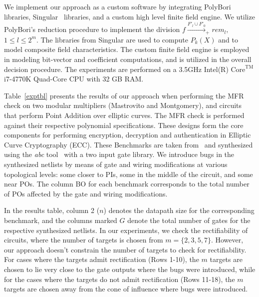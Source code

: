 
We implement our approach as a custom software by integrating PolyBori~\cite{pbori:JSC09} libraries,
{\sc Singular}~\cite{DGPS_410} libraries, and a custom high level finite field engine.
We utilize PolyBori’s reduction procedure to implement the division 
$f\xrightarrow{F'_l\cup F'_{0}}_+ rem_l,$ $ 1 \leq l \leq 2^m$. The libraries from {\sc Singular} 
are used to compute $P_k(X)$ and to model composite field characteristics.
The custom finite field engine is employed in modeling bit-vector and coefficient computations,
and is utilized in the overall decision procedure. The experiments are performed on a 3.5GHz 
Intel(R) $\text{Core}^{\text{TM}}$ i7-4770K Quad-Core CPU with 32 GB RAM.

Table~\ref{exptbl} presents the results of our approach when 
performing the MFR check on two modular multipliers (Mastrovito and Montgomery), and circuits
that perform Point Addition over elliptic curves. The MFR check is performed against 
their respective polynomial specifications. 
These designs form the core components for performing encryption, 
decryption and authentication in Elliptic Curve Cryptography (ECC).
These Benchmarks are taken from~\cite{lv:tcad2013} and synthesized using the {\it abc} 
tool~\cite{abc} with a two input gate library.
We introduce bugs in the synthesized netlists by means of gate and wiring 
modifications at various topological levels: some closer to PIs, 
some in the middle of the circuit, and some near POs.
The column BO for each benchmark corresponds to the total number of POs affected by the 
gate and wiring modifications. 

In the results table, column 2 ($n$) denotes the datapath size for the corresponding benchmark,
and the columns marked $G$ denote the total number of gates for the respective synthesized netlists.
 In our experiments, we check the rectifiability of circuits, where the number of targets
is chosen from $m=\{2,3,5,7\}$. However, our approach doesn't constrain the number 
of targets to check for rectifiability. For cases where the targets admit rectification 
(Rows 1-10), the $m$ targets are chosen to lie very close to the gate outputs 
where the bugs were introduced, while for the cases where the targets 
do not admit rectification (Rows 11-18), the $m$ targets are chosen away 
from the cone of influence where bugs were introduced.


